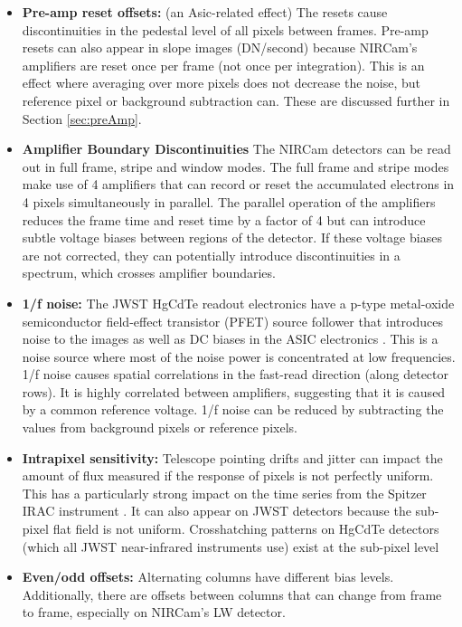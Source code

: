 \documentclass{aastex62}
\begin{document}
\begin{itemize}[noitemsep]
	\item \textbf{Pre-amp reset offsets:} (an Asic-related effect) 
The resets cause discontinuities in the pedestal level of all pixels between frames.
Pre-amp resets can also appear in slope images (DN/second) because NIRCam's amplifiers are reset once per frame (not once per integration).
This is an effect where averaging over more pixels does not decrease the noise, but reference pixel or background subtraction can.
These are discussed further in Section \ref{sec:preAmp}.
	\item \textbf{Amplifier Boundary Discontinuities} The NIRCam detectors can be read out in full frame, stripe and window modes. The full frame and stripe modes make use of 4 amplifiers that can record or reset the accumulated electrons in 4 pixels simultaneously in parallel. The parallel operation of the amplifiers reduces the frame time and reset time by a factor of 4 but can introduce subtle voltage biases between regions of the detector. If these voltage biases are not corrected, they can potentially introduce discontinuities in a spectrum, which crosses amplifier boundaries.
	\item \textbf{1/f noise:} The JWST HgCdTe readout electronics have a p-type metal-oxide semiconductor field-effect transistor (PFET) source follower that introduces noise to the images as well as DC biases in the ASIC electronics \citep{rauscher2011irsSquared}.
	This is a noise source where most of the noise power is concentrated at low frequencies.
	1/f noise causes spatial correlations in the fast-read direction (along detector rows). It is highly correlated between amplifiers, suggesting that it is caused by a common reference voltage. 1/f noise can be reduced by subtracting the values from background pixels or reference pixels.
	\item \textbf{Intrapixel sensitivity:} Telescope pointing drifts and jitter can impact the amount of flux measured if the response of pixels is not perfectly uniform.
	This has a particularly strong impact on the time series from the Spitzer IRAC instrument \citep{ingalls2016spitzerRepeatability}.
	It can also appear on JWST detectors because the sub-pixel flat field is not uniform.
	Crosshatching patterns on HgCdTe detectors (which all JWST near-infrared instruments use) exist at the sub-pixel level  \citep{shapiro2018crosshatch,ninan2019crosshatchHPF}
	\item \textbf{Even/odd offsets:} Alternating columns have different bias levels. Additionally, there are offsets between columns that can change from frame to frame, especially on NIRCam's LW detector.

\end{itemize}
\end{document}
